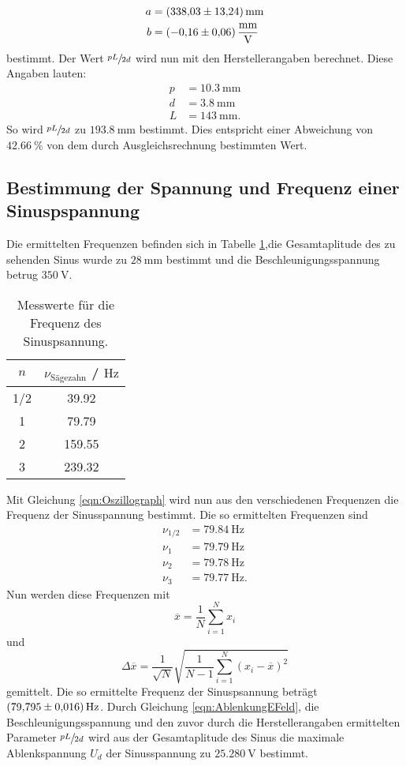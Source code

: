 \begin{align*}
  a &= \SI{338.03\pm13.24}{\milli\metre} \\
  b &= \SI{-0.16\pm0.06}{\milli\metre\per\volt}
\end{align*}
bestimmt. Der Wert $\sfrac{pL}{2d}$ wird nun mit den Herstellerangaben berechnet. Diese Angaben lauten:
\begin{align*}
  p &= \SI{10.3}{\milli\metre} \\
  d &= \SI{3.8}{\milli\metre} \\
  L &= \SI{143}{\milli\metre}.
\end{align*}
So wird $\sfrac{pL}{2d}$ zu $\SI{193.8}{\milli\metre}$ bestimmt. Dies entspricht einer Abweichung von $\SI{42.66}{\percent}$ von dem durch
Ausgleichsrechnung bestimmten Wert.
\FloatBarrier
\subsection{Bestimmung der Spannung und Frequenz einer Sinuspspannung}
Die ermittelten Frequenzen befinden sich in Tabelle \ref{tab:freq},die Gesamtaplitude des zu sehenden Sinus wurde zu
$\SI{28}{\milli\metre}$ bestimmt und die Beschleunigungsspannung betrug $\SI{350}{\volt}$.

\begin{table}
  \centering
  \caption{Messwerte für die Frequenz des Sinuspsannung.}
  \label{tab:freq}
  \begin{tabular}[t]{c c}
   \toprule
   $n$ & ${\nu}_{\text{Sägezahn}}$ / $\si{\hertz}$ \\
   \midrule
    1/2 & 39.92 \\
     1  & 79.79 \\
     2  &159.55 \\
     3  &239.32 \\
   \bottomrule
   \end{tabular}
 \end{table}
Mit Gleichung \eqref{eqn:Oszillograph} wird nun aus den verschiedenen Frequenzen die Frequenz der Sinusspannung bestimmt. Die so ermittelten Frequenzen sind
\begin{align*}
  {\nu}_{1/2} &= \SI{79.84}{\hertz} \\
  {\nu}_{1} &= \SI{79.79}{\hertz} \\
  {\nu}_{2} &= \SI{79.78}{\hertz} \\
  {\nu}_{3} &= \SI{79.77}{\hertz}.
\end{align*}
Nun werden diese Frequenzen mit
\begin{equation}
  \label{eqn:mittelwert}
  \overline{x} = \frac{1}{N} \sum_{i=1}^N x_i
\end{equation}
und
\begin{equation}
  \label{eqn:mittelwertfehler}
  \Delta \overline{x} = \frac{1}{\sqrt{N}} \sqrt{\frac{1}{N-1} \sum_{i=1}^N (x_i - \overline{x})^2}
\end{equation}
gemittelt. Die so ermittelte Frequenz der Sinuspsannung beträgt $\SI{79.795\pm0.016}{\hertz}$.
Durch Gleichung \eqref{eqn:AblenkungEFeld}, die Beschleunigungsspannung und den zuvor durch die Herstellerangaben ermittelten Parameter $\sfrac{pL}{2d}$
wird aus der Gesamtaplitude des Sinus die maximale Ablenkspannung $U_d$ der Sinusspannung zu $\SI{25.280}{\volt}$ bestimmt.
\FloatBarrier

